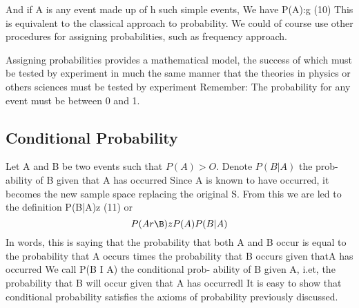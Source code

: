 And if A is any event made up of h such simple events, We
have
P(A):g (10)
This is equivalent to the classical approach to probability. We could of course use other procedures for assigning probabilities, such as frequency approach.



Assigning probabilities provides a mathematical model, the success
of which must be tested by experiment in much the same manner that
the theories in physics or others sciences must be tested by experiment
Remember: The probability for any event must be between 0 and 1.

\subsection*{Conditional Probability}
Let A and B be two events such that $P(A) > O$. Denote $P(B | A)$ the prob-
ability of B given that A has occurred Since A is known to have
occurred, it becomes the new sample space replacing the original S.
From this we are led to the deﬁnition
P(B|A)z  (11)
or
\[P(Ar\B)z P(A)P(B|A) \] %
In words, this is saying that the probability that both A and B occur
is equal to the probability that A occurs times the probability that B
occurs given thatA has occurred We call P(B I A) the conditional prob-
ability of B given A, i.et, the probability that B will occur given that A
has occurredl It is easy to show that conditional probability satisﬁes the
axioms of probability previously discussed.

